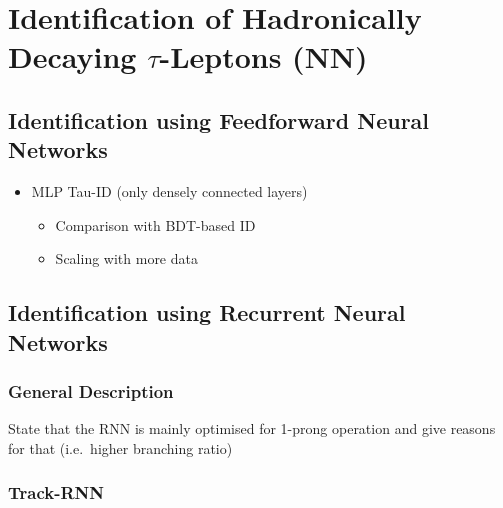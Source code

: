 \chapter{Identification of Hadronically Decaying $\tau$-Leptons (NN)}
\label{sec:rnn}

\section{Identification using Feedforward Neural Networks}
\label{sec:ffnn_id}

\begin{itemize}
\item MLP Tau-ID (only densely connected layers)
  \begin{itemize}
  \item Comparison with BDT-based ID
  \item Scaling with more data
  \end{itemize}
\end{itemize}

\section{Identification using Recurrent Neural Networks}
\label{sec:rnn_id}

\subsection{General Description}
\label{sec:rnn_descr}

State that the RNN is mainly optimised for 1-prong operation and give reasons
for that (i.e.\ higher branching ratio)

\subsection{Track-RNN}
\label{sec:rnn_tracks}




